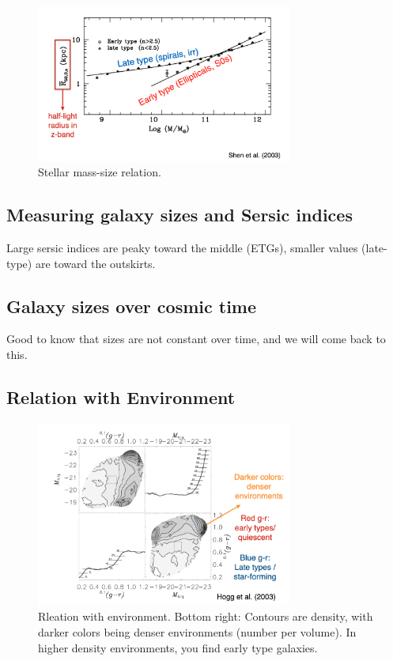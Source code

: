 \documentclass{article}
\begin{document}
\begin{figure}
    \centering
    \includegraphics[width=0.75\textwidth]{figs/Screen Shot 2021-09-03 at 11.29.54 AM.png}
    \caption{Stellar mass-size relation. }
    \label{fig:smsr}
\end{figure}

\subsection{Measuring galaxy sizes and Sersic indices}

Large sersic indices are peaky toward the middle (ETGs), smaller values (late-type) are toward the outskirts. 

\subsection{Galaxy sizes over cosmic time}

Good to know that sizes are not constant over time, and we will come back to this. 

\subsection{Relation with Environment}

\begin{figure}
    \centering
    \includegraphics[width=0.75\textwidth]{figs/Screen Shot 2021-09-03 at 11.30.25 AM.png}
    \caption{Rleation with environment. Bottom right: Contours are density, with darker colors being denser environments (number per volume). In higher density environments, you find early type galaxies. }
    \label{fig:env}
\end{figure}
\end{document}
